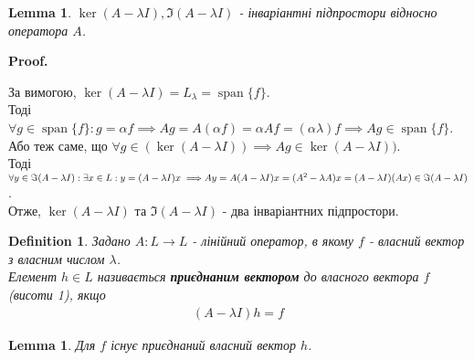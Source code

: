 \documentclass[a4paper, 10pt]{article}
\makeatletter
\theoremstyle{theoremdd}
\newtheorem{definition}[theorem]{Definition}
\newtheorem{lemma}[theorem]{Lemma}
\DeclareMathOperator{\linspan}{span}
\renewenvironment{proof}[1][Proof.\\]{\par
\pushQED{\hfill \qed}%
\normalfont \topsep6\p@\@plus6\p@\relax
\trivlist
\item\relax
{\bfseries
#1\@addpunct{.}}\hspace\labelsep\ignorespaces
}{%
\popQED\endtrivlist\@endpefalse
}
\makeatother
\begin{document}
\begin{lemma}
$\ker(A - \lambda I), \Im(A-\lambda I)$ - інваріантні підпростори відносно оператора $A$.
\end{lemma}

\begin{proof}
За вимогою, $\ker(A-\lambda I) = L_{\lambda} = \linspan\{f\}$.\\
Тоді $\forall g \in \linspan\{f\}: g = \alpha f \implies Ag = A(\alpha f) = \alpha Af = (\alpha \lambda) f \implies Ag \in \linspan\{f\}$. Або теж саме, що $\forall g \in (\ker(A - \lambda I)) \implies Ag \in  \ker(A - \lambda I))$.
\bigskip \\
Тоді $\forall y \in \Im(A-\lambda I): \exists x \in L: y = (A-\lambda I)x \implies \\ Ay = A(A-\lambda I)x = (A^2-\lambda A)x = (A-\lambda I)(Ax) \in \Im(A-\lambda I)$.\\
Отже, $\ker(A-\lambda I)$ та $\Im(A-\lambda I)$ - два інваріантних підпростори.
\end{proof}

\begin{definition}
Задано $A: L \to L$ - лінійний оператор, в якому $f$ - власний вектор з власним числом $\lambda$.\\
Елемент $h \in L$ називається \textbf{приєднаним вектором} до власного вектора $f$ (висоти 1), якщо
\begin{align*}
(A-\lambda I)h = f
\end{align*}
\end{definition}

\begin{lemma}
Для $f$ існує приєднаний власний вектор $h$.
\end{lemma}
\end{document}
